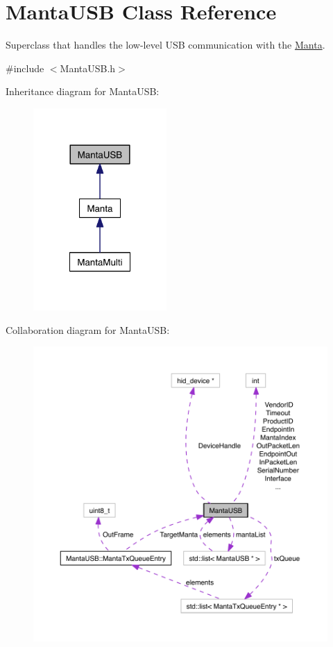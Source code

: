 \hypertarget{classMantaUSB}{\section{\-Manta\-U\-S\-B \-Class \-Reference}
\label{classMantaUSB}
}


\-Superclass that handles the low-\/level \-U\-S\-B communication with the \hyperlink{classManta}{\-Manta}.  




{\ttfamily \#include $<$\-Manta\-U\-S\-B.\-h$>$}



\-Inheritance diagram for \-Manta\-U\-S\-B\-:
\nopagebreak
\begin{figure}[H]
\begin{center}
\leavevmode
\includegraphics[width=144pt]{classMantaUSB__inherit__graph}
\end{center}
\end{figure}


\-Collaboration diagram for \-Manta\-U\-S\-B\-:\nopagebreak
\begin{figure}[H]
\begin{center}
\leavevmode
\includegraphics[width=350pt]{classMantaUSB__coll__graph}
\end{center}
\end{figure}
